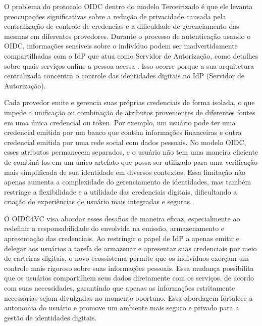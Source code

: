 O problema do protocolo \acs{OIDC} dentro do modelo Terceirizado é que ele levanta preocupações significativas sobre a redução de privacidade causada pela centralização de controle de credencias e a dificuldade de gerenciamento das mesmas em diferentes provedores. Durante o processo de autenticação usando o \acs{OIDC}, informações sensíveis sobre o indivíduo podem ser inadvertidamente compartilhadas com o \acs{IdP} que atua como Servidor de Autorização, como detalhes sobre quais serviços online a pessoa acessa \cite[Página 7]{OIDC4VCWhitepaper2022}. Isso ocorre porque a sua arquitetura centralizada concentra o controle das identidades digitais no \acs{IdP} (Servidor de Autorização).

Cada provedor emite e gerencia suas próprias credenciais de forma isolada, o que impede a unificação ou combinação de atributos provenientes de diferentes fontes em uma única credencial ou token. Por exemplo, um usuário pode ter uma credencial emitida por um banco que contém informações financeiras e outra credencial emitida por uma rede social com dados pessoais. No modelo \acs{OIDC}, esses atributos permanecem separados, e o usuário não tem uma maneira eficiente de combiná-los em um único artefato que possa ser utilizado para uma verificação mais simplificada de sua identidade em diversos contextos. Essa limitação não apenas aumenta a complexidade do gerenciamento de identidades, mas também restringe a flexibilidade e a utilidade das credenciais digitais, dificultando a criação de experiências de usuário mais integradas e seguras.

O \acs{OIDC4VC} visa abordar esses desafios de maneira eficaz, especialmente ao redefinir a responsabilidade do envolvida na emissão, armazenamento e apresentação das credenciais. Ao restringir o papel de \acs{IdP} a apenas emitir e delegar aos usuários a tarefa de armazenar e apresentar suas credenciais por meio de carteiras digitais, o novo ecossistema permite que os indivíduos exerçam um controle mais rigoroso sobre suas informações pessoais. Essa mudança possibilita que os usuários compartilhem seus dados diretamente com os serviços, de acordo com suas necessidades, garantindo que apenas as informações estritamente necessárias sejam divulgadas no momento oportuno. Essa abordagem fortalece a autonomia do usuário e promove um ambiente mais seguro e privado para a gestão de identidades digitais.

